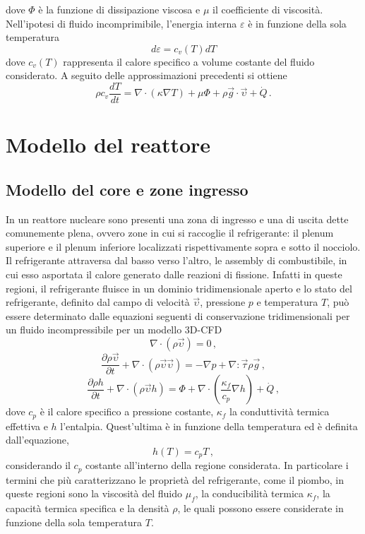 dove $\Phi$ è la funzione di dissipazione viscosa e $\mu$ il coefficiente di 
viscosità.
Nell'ipotesi di fluido incomprimibile, l'energia interna $\varepsilon$ è in 
funzione della sola temperatura
\begin{equation}
 d\varepsilon=c_v(T)dT
\end{equation}
dove $c_v(T)$ rappresenta il calore specifico a volume costante del fluido 
considerato.
A seguito delle approssimazioni precedenti si ottiene
\begin{equation}\label{eq dell'energia}
 \rho c_v\frac{dT}{dt}=\nabla \cdot (\kappa \nabla T) + \mu \Phi + \rho 
\vec{g}\cdot \vec{\upsilon} + \dot{Q} \,.
\end{equation}

\section{Modello del reattore}

\subsection{Modello del core e zone ingresso}
In un reattore nucleare sono presenti una zona di ingresso 
e una di uscita dette comunemente plena, ovvero zone in cui si raccoglie 
il refrigerante: il plenum superiore e il plenum inferiore localizzati 
rispettivamente sopra e sotto il nocciolo. Il refrigerante attraversa dal basso 
verso l'altro, le assembly di combustibile, in cui esso asportata 
il calore 
generato dalle reazioni di fissione.
Infatti in queste regioni, il refrigerante fluisce in un dominio 
tridimensionale 
aperto e lo stato del refrigerante, definito dal campo di velocità 
$\vec{\upsilon}$, pressione $p$ e temperatura $T$, può essere determinato dalle 
equazioni seguenti di conservazione tridimensionali per un fluido 
incompressibile 
per un modello 3D-CFD
\begin{equation}
 \nabla \cdot (\rho \vec{\upsilon}) = 0 \,,
\end{equation}
\begin{equation}
 \frac{\partial \rho \vec{\upsilon}}{\partial t} + \nabla \cdot 
(\rho\vec{\upsilon}\vec{\upsilon}) = - \nabla p + \nabla : \vec{\tau} \rho 
\vec{g} \,,
\end{equation}
\begin{equation}
\frac{\partial \rho h}{\partial t} + \nabla \cdot (\rho \vec{\upsilon} h) = 
\Phi 
+ \nabla \cdot (\frac{\kappa_f}{c_p} \nabla h) + \dot{Q} \,,
\end{equation}
dove $c_p$ è il calore specifico a pressione costante, $\kappa_f$ la 
conduttività termica effettiva e $h$ l'entalpia.
Quest'ultima è in funzione della temperatura ed è definita dall'equazione,
\begin{equation}
 h(T)=c_p T \,,
\end{equation}
considerando il $c_p$ costante all'interno della regione considerata.
In particolare i termini che più caratterizzano le proprietà del refrigerante, 
come il piombo, in queste regioni sono la viscosità del fluido $\mu_f$, 
la conducibilità termica $\kappa_f$, la capacità termica specifica e la densità 
$\rho$, le quali possono essere considerate in funzione della sola
temperatura $T$.

